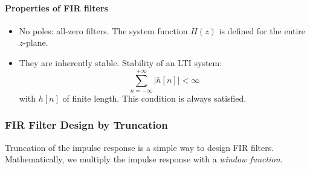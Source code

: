 \paragraph{Properties of FIR filters}
\begin{itemize}
    \item No poles: all-zero filters. The system function $H(z)$ is defined for the entire $z$-plane.
    \item They are inherently stable. Stability of an LTI system:
    \[
        \sum_{n=-\infty}^{+\infty} \lvert h[n] \rvert < \infty
    \]
    with $h[n]$ of finite length. This condition is always satisfied.
\end{itemize}

\subsubsection{FIR Filter Design by Truncation}
Truncation of the impulse response is a simple way to design FIR filters. Mathematically, we multiply the impulse response with a \textit{window function}.

